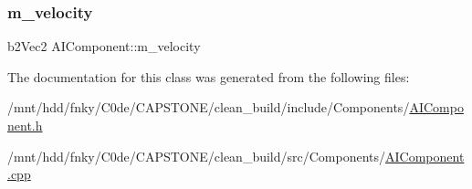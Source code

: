 \mbox{\label{classAIComponent_abdffe34d98dd34e51c777512bce686ca}} 
\subsubsection{\texorpdfstring{m\+\_\+velocity}{m\_velocity}}
{\footnotesize\ttfamily b2\+Vec2 A\+I\+Component\+::m\+\_\+velocity\hspace{0.3cm}{\ttfamily [private]}}



The documentation for this class was generated from the following files\+:\begin{DoxyCompactItemize}
\item 
/mnt/hdd/fnky/\+C0de/\+C\+A\+P\+S\+T\+O\+N\+E/clean\+\_\+build/include/\+Components/\hyperlink{AIComponent_8h}{A\+I\+Component.\+h}\item 
/mnt/hdd/fnky/\+C0de/\+C\+A\+P\+S\+T\+O\+N\+E/clean\+\_\+build/src/\+Components/\hyperlink{AIComponent_8cpp}{A\+I\+Component.\+cpp}\end{DoxyCompactItemize}
